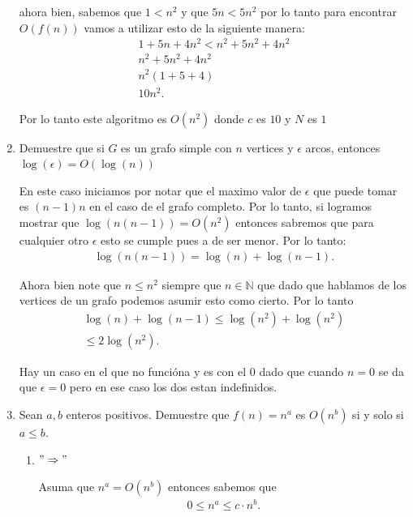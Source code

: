\documentclass[12pt]{exam}
\begin{document}
\begin{enumerate}
  ahora bien, sabemos que $1<n^2$ y que $5n<5n^2$ por lo tanto para encontrar $O\left( f\left( n \right)  \right) $ vamos a utilizar esto de la siguiente manera:
  \begin{align*}
    1 + 5n + 4n^2 < n^2 + 5n^2 + 4n^2\\
    n^2 + 5n^2 + 4n^2\\
    n^2\left( 1 + 5 + 4 \right) \\
    10n^2
  .\end{align*}
  
  Por lo tanto este algoritmo es $O\left( n^2  \right) $ donde $c$ es $10$ y $N$ es $1$

\item Demuestre que si  $G$ es un grafo simple con $n$ vertices y $\epsilon$ arcos, entonces $\log\left( \epsilon \right) = O\left( \log\left( n \right)  \right) $

  En este caso iniciamos por notar que el maximo valor de $\epsilon$ que puede tomar es $\left( n-1 \right) n$ en el caso de el grafo completo. Por lo tanto, si logramos mostrar que $\log\left( n \left( n-1 \right)  \right) = O\left( n^2 \right) $ entonces sabremos que para cualquier otro $\epsilon$ esto se cumple pues a de ser menor. Por lo tanto:
  \begin{align*}
    \log\left( n\left( n-1 \right)  \right) = \log\left( n \right) + \log\left( n-1 \right) 
  .\end{align*}

  Ahora bien note que $n\le n^2$ siempre que $n\in \mathbb{N}$ que dado que hablamos de los vertices de un grafo podemos asumir esto como cierto. Por lo tanto
  \begin{align*}
    \log\left( n \right) + \log\left( n-1 \right) \le \log\left( n^2 \right) + \log\left( n^2 \right) \\
    \le 2\log\left( n^2 \right) 
  .\end{align*}

  Hay un caso en el que no funcióna y es con el $0$ dado que cuando $n=0$ se da que $\epsilon = 0$ pero en ese caso los dos estan indefinidos.

\item Sean $a,b$ enteros positivos. Demuestre que $f\left( n \right) = n^a$ es $O\left( n^{b} \right) $ si y solo si $a\le b$.
  \begin{enumerate}
    \item $"\Rightarrow"$

      Asuma que $n^{a}=O\left( n^{b} \right) $ entonces sabemos que
      \begin{align*}
        0\le n^{a} \le c\cdot n^{b}
      .\end{align*}
      

\end{enumerate}
\end{enumerate}
\end{document}
